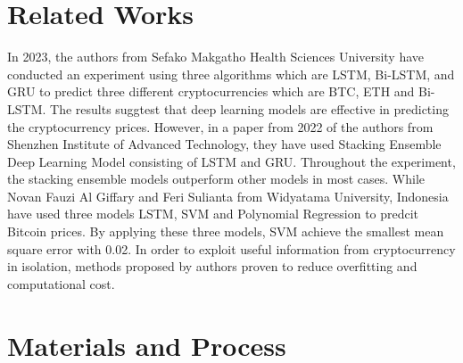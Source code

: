 \documentclass{ieeeojies}
\begin{document}
\section{Related Works}
In 2023, the authors \cite{seabe2023forecasting} from Sefako Makgatho Health Sciences University have conducted an experiment using three algorithms which are LSTM, Bi-LSTM, and GRU to predict three different cryptocurrencies which are BTC, ETH and Bi-LSTM. The results suggtest that deep learning models are effective in predicting the cryptocurrency prices. However, in a paper from 2022 of the authors \cite{ye2022stacking} from Shenzhen Institute of Advanced Technology, they have used Stacking Ensemble Deep Learning Model consisting of LSTM and GRU. Throughout the experiment, the stacking ensemble models outperform other models in most cases. While Novan Fauzi Al Giffary and Feri Sulianta \cite{fauzi2024prediction} from Widyatama University, Indonesia have used three models LSTM, SVM and Polynomial Regression to predcit Bitcoin prices. By applying these three models, SVM achieve the smallest mean square error with 0.02. In order to exploit useful information from cryptocurrency in isolation, methods proposed by  authors \cite{livieris2021advanced} proven to reduce overfitting and computational cost. 


\section{Materials and Process}
\end{document}
